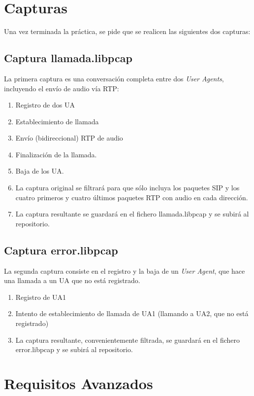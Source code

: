 \documentclass[a4paper,11pt]{article}
\begin{document}
\section{Capturas}

Una vez terminada la práctica, se pide que se realicen las 
siguientes dos capturas:

\subsection{Captura llamada.libpcap}

La primera captura es una conversación completa entre dos \emph{User Agents}, incluyendo el envío de audio vía RTP:

\begin{enumerate}
  \item Registro de dos UA
  \item Establecimiento de llamada
  \item Envío (bidireccional) RTP de audio
  \item Finalización de la llamada.
  \item Baja de los UA.
  \item La captura original se filtrará para que sólo incluya los paquetes
SIP y los cuatro primeros y cuatro últimos paquetes RTP con audio en cada dirección.
  \item La captura resultante se guardará en el fichero llamada.libpcap
y se subirá al repositorio.
\end{enumerate}

\subsection{Captura error.libpcap}

La segunda captura consiste en el registro y la baja de un \emph{User Agent}, que hace una llamada a un UA que no está registrado.

\begin{enumerate}
  \item Registro de UA1
  \item Intento de establecimiento de llamada de UA1 (llamando a UA2, que no está registrado)
  \item La captura resultante, convenientemente filtrada, se guardará en el fichero error.libpcap
y se subirá al repositorio.
\end{enumerate}


\section{Requisitos Avanzados}
\end{document}
